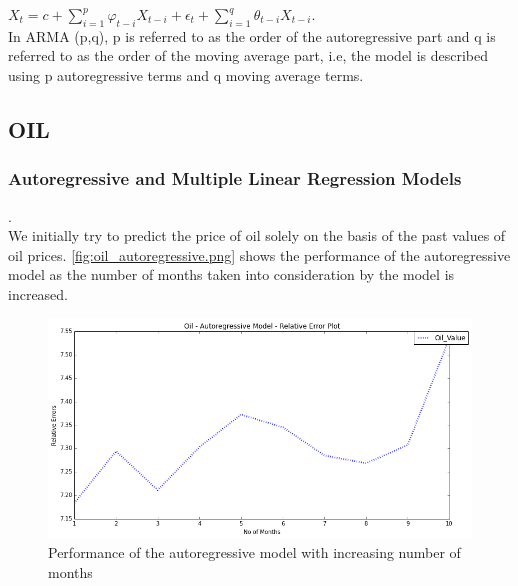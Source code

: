 \documentclass[runningheads]{llncs}
\begin{document}
$ X_{t} = c + \sum\limits_{i=1}^p \varphi_{t-i}X_{t-i} + \epsilon_{t} + \sum\limits_{i=1}^q \theta_{t-i}X_{t-i}$.\\

In ARMA (p,q), p is referred to as the order of the autoregressive part and q is referred to as the order of the moving average part, i.e, the model is described using p autoregressive terms and q moving average terms.\\ 


\subsection {OIL}

\subsubsection {Autoregressive and Multiple Linear Regression Models}.\\

We initially try to predict the price of oil solely on the basis of the past values of oil prices. \autoref{fig:oil_autoregressive.png} shows the performance of the autoregressive model as the number of months taken into consideration by the model is increased. \\

\begin{figure}
\centering
\includegraphics[width=\textwidth]{oil_autoregressive.png}
\caption{Performance of the autoregressive model with increasing number of months}
\label{fig:oil_autoregressive.png}
\end{figure}
\end{document}
